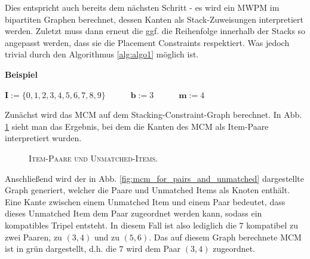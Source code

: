 Dies entspricht auch bereits dem nächsten Schritt - es wird ein \textsc{MWPM} im bipartiten Graphen berechnet, dessen Kanten
als Stack-Zuweisungen interpretiert werden. Zuletzt muss dann erneut die ggf. die Reihenfolge innerhalb der Stacks so angepasst werden,
dass sie die Placement Constraints respektiert. Was jedoch trivial durch den Algorithmus \ref{alg:algo1} möglich ist.

\textbf{Beispiel}

$\boldsymbol{I} := \{0, 1, 2, 3, 4, 5, 6, 7, 8, 9\} \quad\quad\quad \boldsymbol{b} := 3 \quad\quad\quad \boldsymbol{m} := 4$

Zunächst wird das \textsc{MCM} auf dem Stacking-Constraint-Graph berechnet.
In Abb. \ref{fig:pairs_and_unmatched} sieht man das Ergebnis, bei dem die Kanten des \textsc{MCM} als Item-Paare interpretiert wurden.

\begin{figure}[H]
\centering
{}
\caption{\textsc{Item-Paare und Unmatched-Items.}}
\label{fig:pairs_and_unmatched}
\end{figure}

Anschließend wird der in Abb. \ref{fig:mcm_for_pairs_and_unmatched} dargestellte Graph generiert, welcher die Paare und
Unmatched Items als Knoten enthält. Eine Kante zwischen einem Unmatched Item und einem Paar bedeutet, dass dieses Unmatched
Item dem Paar zugeordnet werden kann, sodass ein kompatibles Tripel entsteht.
In diesem Fall ist also lediglich die $7$ kompatibel zu zwei Paaren, zu $(3, 4)$ und zu $(5, 6)$. Das auf diesem Graph
berechnete \textsc{MCM} ist in grün dargestellt, d.h. die $7$ wird dem Paar $(3, 4)$ zugeordnet.

